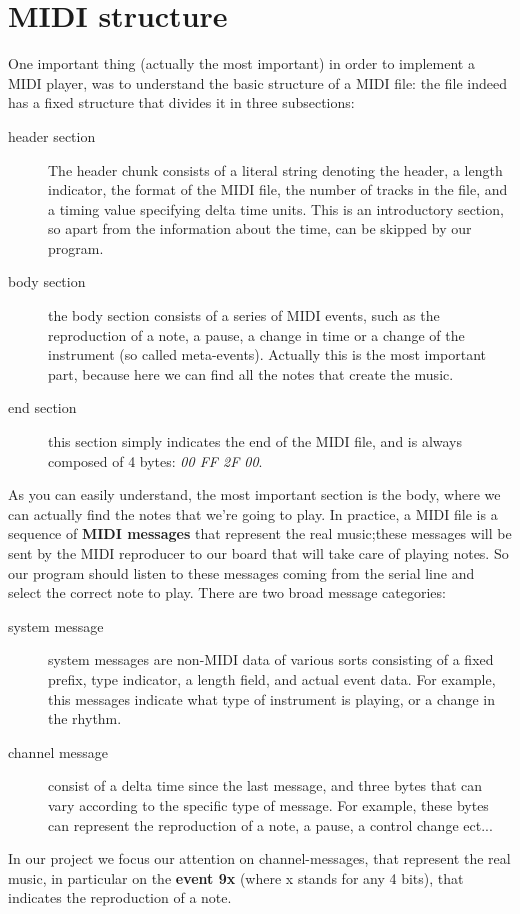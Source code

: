 \documentclass[12pt]{article}
\begin{document}
\section{MIDI structure} \label{sec:structure}
One important thing (actually the most important) in order to implement a MIDI player, was to understand the basic structure of a MIDI file: the file indeed has a fixed structure that divides it in three subsections: 
\begin{description} 
	\item[header section] The header chunk consists of a literal string denoting the header, a length indicator, the format of the MIDI file, the number of tracks in the file, and a timing value specifying delta time units. This is an introductory section, so apart from the information about the time, can be skipped by our program.
	\item[body section] the body section consists of a series of MIDI events, such as the reproduction of a note, a pause, a change in time or a change of the instrument (so called meta-events). Actually this is the most important part, because here we can find all the notes that create the music.
	\item[end section] this section simply indicates the end of the MIDI file, and is always composed of 4 bytes: \emph{00 FF 2F 00}.
\end{description}
As you can easily understand, the most important section is the body, where we can actually find the notes that we're going to play. In practice, a MIDI file is a sequence of \textbf{MIDI messages} that represent the real music;these messages will be sent by the MIDI reproducer to our board that will take care of playing notes. So our program should listen to these messages coming from the serial line and select the correct note to play.\newline 
There are two broad message categories: 
\begin{description} 
	\item[system message] system messages are non-MIDI data of various sorts consisting of a fixed prefix, type indicator, a length field, and actual event data. For example, this messages indicate what type of instrument is playing, or a change in the rhythm.
	\item[channel message] consist of a delta time since the last message, and three bytes that can vary according to the specific type of message. For example, these bytes can represent the reproduction of a note, a pause, a control change ect...
\end{description}
In our project we focus our attention on channel-messages, that represent the real music, in particular on the \textbf{event 9x} (where x stands for any 4 bits), that indicates the reproduction of a note.
\end{document}

